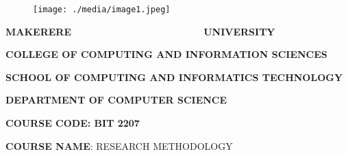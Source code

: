 \documentclass[12pt]{article}
\begin{document}

\begin{figure}[H]
	\begin{Center}
		\texttt{[image: ./media/image1.jpeg]}
	\end{Center}
\end{figure}



\setlength{\parskip}{6.0pt}
\par

\begin{Center}
{\fontsize{13pt}{15.6pt}\selectfont \textbf{MAKERERE\ \ \ \ \ \ \ \ \ \ \ \ \ \ \ \ \ \ \ \ \ \ \ \  UNIVERSITY}\par}
\end{Center}\par


\vspace{\baselineskip}
\setlength{\parskip}{0.0pt}
\begin{Center}
{\fontsize{13pt}{15.6pt}\selectfont \textbf{COLLEGE OF COMPUTING AND INFORMATION SCIENCES}\par}
\end{Center}\par

\begin{Center}
{\fontsize{13pt}{15.6pt}\selectfont \textbf{SCHOOL OF COMPUTING AND INFORMATICS TECHNOLOGY}\par}
\end{Center}\par

\begin{Center}
{\fontsize{13pt}{15.6pt}\selectfont \textbf{DEPARTMENT OF COMPUTER SCIENCE}\par}
\end{Center}\par

\begin{Center}
{\fontsize{13pt}{15.6pt}\selectfont \textbf{COURSE CODE: BIT 2207 }\par}
\end{Center}\par


\vspace{\baselineskip}
\begin{Center}
{\fontsize{13pt}{15.6pt}\selectfont \textbf{COURSE NAME}: RESEARCH METHODOLOGY\par}
\end{Center}\par
\end{document}
